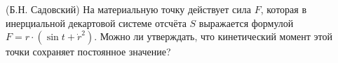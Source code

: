 (Б.Н. Садовский)
На материальную точку действует сила $F$, которая в инерциальной
декартовой системе отсчёта $S$ выражается формулой $F=r\cdot(\sin t+\dot
r^2)$. Можно ли утверждать, что кинетический момент этой точки сохраняет
постоянное значение?
